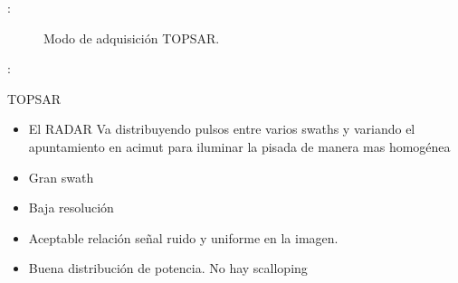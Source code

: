 \begin{frame}{\secname : \subsecname}
  \begin{figure}
    \centering
    \caption{Modo de adquisición TOPSAR.}
    \label{}
  \end{figure}
\end{frame}

\begin{frame}{\secname : \subsecname}
    \begin{block}{TOPSAR}
      \begin{itemize}
        \item El RADAR Va distribuyendo pulsos entre varios swaths y variando el apuntamiento en acimut para iluminar la pisada de manera mas homogénea
        \item Gran swath
        \item Baja resolución
        \item Aceptable relación señal ruido y uniforme en la imagen.
        \item Buena distribución de potencia. No hay scalloping
      \end{itemize}
    \end{block}
\end{frame}
